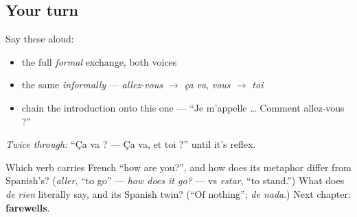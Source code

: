 \subsection*{Your turn}
Say these aloud:

\begin{itemize}
\raggedright
  \item the full \emph{formal} exchange, both voices
  \item the same \emph{informally} — \emph{allez-vous $\to$ ça va}, \emph{vous $\to$ toi}
  \item chain the introduction onto this one — \textquotedblleft{}Je m'appelle … Comment allez-vous ?\textquotedblright{}
\end{itemize}

\emph{Twice through:} \textquotedblleft{}Ça va ? — Ça va, et toi ?\textquotedblright{} until it's reflex.

\begin{tcolorbox}[breakable,colback=teal!4,colframe=teal!35!black,title={Before you move on}]
Which verb carries French \textquotedblleft{}how are you?\textquotedblright{}, and how does its metaphor differ from Spanish's? (\emph{aller}, \textquotedblleft{}to go\textquotedblright{} — \emph{how does it go?} — vs \emph{estar}, \textquotedblleft{}to stand.\textquotedblright{}) What does \emph{de rien} literally say, and its Spanish twin? (\textquotedblleft{}Of nothing\textquotedblright{}; \emph{de nada}.) Next chapter: \textbf{farewells}.
\end{tcolorbox}
